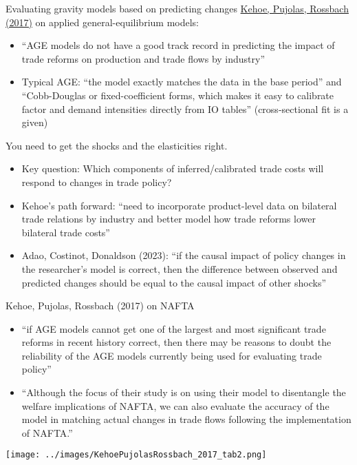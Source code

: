 \documentclass[10pt,notes=hide,aspectratio=169]{beamer}
\begin{document}
\begin{frame}{Evaluating gravity models based on predicting changes}
\href{https://doi.org/10.1146/annurev-economics-080614-115502}{Kehoe, Pujolas, Rossbach (2017)} on applied general-equilibrium models:
\begin{itemize}
\item ``AGE models do not have a good track record in predicting the impact of trade reforms on production and trade flows by industry''
\item Typical AGE: ``the model exactly matches the data in the base period'' and ``Cobb-Douglas or fixed-coefficient forms, which makes it easy to calibrate factor and demand intensities directly from IO tables'' (cross-sectional fit is a given)
\end{itemize}
You need to get the shocks and the elasticities right.
\begin{itemize}
\item Key question: Which components of inferred/calibrated trade costs will respond to changes in trade policy?
\item Kehoe's path forward: ``need to incorporate product-level data on bilateral trade relations by industry and better model how trade reforms lower bilateral trade costs''
\item Adao, Costinot, Donaldson (2023):
``if the causal impact of policy changes in the researcher's model is correct, then the difference between observed and predicted changes should be equal to the causal impact of other shocks''
\end{itemize}
\end{frame}
\begin{frame}{Kehoe, Pujolas, Rossbach (2017) on NAFTA}
\begin{itemize}
\item {\small ``if AGE models cannot get one of the largest and most significant trade reforms in recent history correct, then there may be reasons to doubt the reliability of the AGE models currently being used for evaluating trade policy''\par}
\item {\small ``Although the focus of their study is on using their model to disentangle the welfare implications of NAFTA, we can also evaluate the accuracy of the model in matching actual changes in trade flows following the implementation of NAFTA.''\par}
\end{itemize}
\texttt{[image: ../images/KehoePujolasRossbach\_2017\_tab2.png]}
\end{frame}
\end{document}
